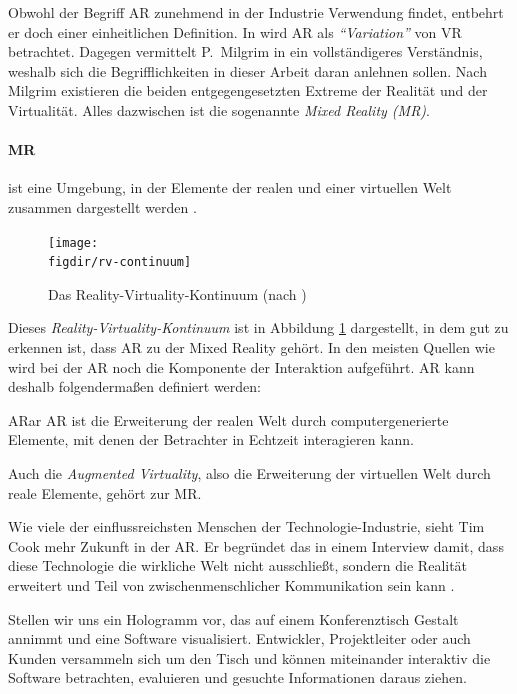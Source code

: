 Obwohl der Begriff AR zunehmend in der Industrie Verwendung findet, entbehrt er doch einer einheitlichen Definition. In \cite{azuma1997survey} wird AR als \emph{"`Variation"'} von VR betrachtet. Dagegen vermittelt P.\ Milgrim in \cite{milgram1995augmented} ein vollständigeres Verständnis, weshalb sich die Begrifflichkeiten in dieser Arbeit daran anlehnen sollen. Nach Milgrim existieren die beiden entgegengesetzten Extreme der Realität und der Virtualität. Alles dazwischen ist die sogenannte \emph{Mixed Reality (MR)}.

\paragraph{MR} ist eine Umgebung, in der Elemente der realen und einer virtuellen Welt zusammen dargestellt werden \cite{kato1999marker}.\\

\begin{figure}[htb]
  \texttt{[image: \\figdir/rv-continuum]}
  \caption{Das Reality-Virtuality-Kontinuum (nach \cite{milgram1995augmented})}
  \label{fig:rv-continuum}
\end{figure}

Dieses \emph{Reality-Virtuality-Kontinuum} ist in Abbildung \ref{fig:rv-continuum} dargestellt, in dem gut zu erkennen ist, dass AR zu der Mixed Reality gehört. In den meisten Quellen wie \cite{azuma1997survey, azuma2001recent, kato1999marker} wird bei der AR noch die Komponente der Interaktion aufgeführt. AR kann deshalb folgendermaßen definiert werden:

\begin{defbox}{AR}{ar}
   AR ist die Erweiterung der realen Welt durch computergenerierte Elemente, mit denen der Betrachter in Echtzeit interagieren kann.
\end{defbox}

Auch die \emph{Augmented Virtuality}, also die Erweiterung der virtuellen Welt durch reale Elemente, gehört zur MR.

Wie viele der einflussreichsten Menschen der Technologie-Industrie, sieht Tim Cook mehr Zukunft in der AR. Er begründet das in einem Interview damit, dass diese Technologie die wirkliche Welt nicht ausschließt, sondern die Realität erweitert und Teil von zwischenmenschlicher Kommunikation sein kann \cite{theindependent2017apple}.

Stellen wir uns ein Hologramm vor, das auf einem Konferenztisch Gestalt annimmt und eine Software visualisiert. Entwickler, Projektleiter oder auch Kunden versammeln sich um den Tisch und können miteinander interaktiv die Software betrachten, evaluieren und gesuchte Informationen daraus ziehen.

